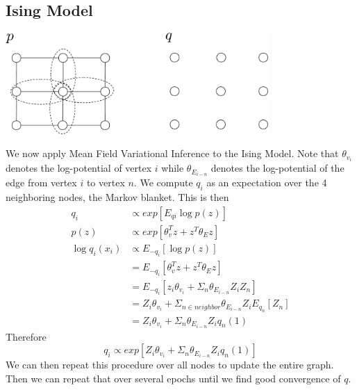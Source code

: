 \documentclass{article}
\begin{document}
\subsection{Ising Model}
\centerline{\includegraphics[width=0.75\textwidth]{fig/mean_field_ising.pdf}}
We now apply Mean Field Variational Inference to the Ising Model.  Note that $\theta_{v_i}$ denotes the log-potential of vertex $i$ while $\theta_{E_{i-n}}$ denotes the log-potential of the edge from vertex $i$ to vertex $n$.  We compute $q_i$ as an expectation over the 4 neighboring nodes, the Markov blanket.  This is then
\begin{align*}
q_i & \propto exp[E_{qi} \log p(z)] \\
p(z) & \propto exp[\theta_v^T z + z^T \theta_E z] \\
\log q_i(x_i) &\propto E_{-q_i} [\log p(z)] \\
&= E_{-q_i} [\theta_v^T z + z^T \theta_E z] \\
&= E_{-q_i} [z_i \theta_{v_i} + \Sigma_n \theta_{E_{i-n}} Z_i Z_n] \\
&= Z_i \theta_{v_i} + \Sigma_{n \in neighbor} \theta_{E_{i-n}} Z_i E_{q_n}[Z_n]\\
&= Z_i \theta_{v_i} + \Sigma_n \theta_{E_{i-n}} Z_i q_n(1)
\end{align*}
Therefore $$q_i \propto exp[Z_i \theta_{v_i} + \Sigma_n \theta_{E_{i-n}} Z_i q_n(1)]$$
We can then repeat this procedure over all nodes to update the entire graph.  Then we can repeat that over several epochs until we find good convergence of $q$.  
\end{document}

